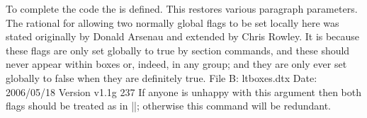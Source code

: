 \makeatletter

\parindent0pt

\def\reflect{\@star@or@long\accommand}
\fboxrule=0.0pt

\long\def\accommand#1{\framebox[4cm][l]{%
     {\tt\string#1 \hfill:}} %
     \parbox[t]{7cm}{\tt\expandafter\strip@prefix\meaning#1}} 


\def\ccommand#1{\parbox[t]{4cm}{\string#1}\parbox[t]{7cm}{#1}}


\reflect{\bm@c}

\reflect{\@pboxswtrue}

\reflect{\@pboxswtrue}

\reflect{\leavevmode}


\meaning\@@par

\meaning\hss

\meaning\ifmmode

\meaning\vbox

\meaning\voidb@x

\def\texprim{\texttt{\protect\TeX\ primitive}}

To complete the code the \cmd{\@arrayparboxrestore} is defined. This  restores various paragraph parameters. The rational for allowing two normally global 
flags to be set locally here was stated originally by Donald Arsenau and extended by Chris Rowley. It is because these  flags are only set globally to true by section commands, and these should
never appear within boxes or, indeed, in any group; and they are only ever set globally to false when they are definitely true.
File B: ltboxes.dtx Date: 2006/05/18 Version v1.1g 237
If anyone is unhappy with this argument then both 
flags should be treated as in |\set@nobreak|; otherwise this command will be redundant.

